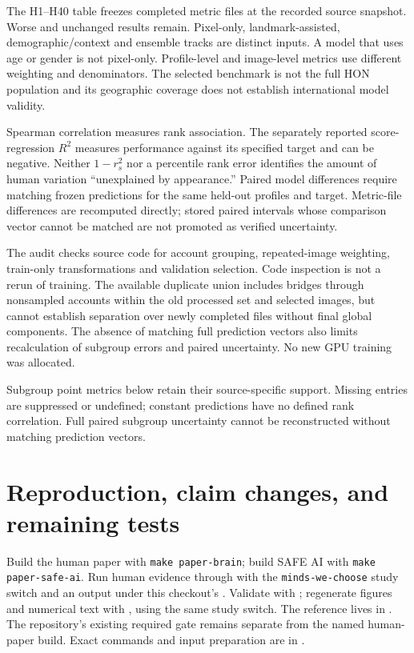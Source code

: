 The H1--H40 table freezes completed metric files at the recorded source snapshot. Worse and unchanged results remain. Pixel-only, landmark-assisted, demographic/context and ensemble tracks are distinct inputs. A model that uses age or gender is not pixel-only. Profile-level and image-level metrics use different weighting and denominators. The selected benchmark is not the full HON population and its geographic coverage does not establish international model validity.

Spearman correlation measures rank association. The separately reported score-regression $R^2$ measures performance against its specified target and can be negative. Neither $1-r_s^2$ nor a percentile rank error identifies the amount of human variation ``unexplained by appearance.'' Paired model differences require matching frozen predictions for the same held-out profiles and target. Metric-file differences are recomputed directly; stored paired intervals whose comparison vector cannot be matched are not promoted as verified uncertainty.

The audit checks source code for account grouping, repeated-image weighting, train-only transformations and validation selection. Code inspection is not a rerun of training. The available duplicate union includes bridges through nonsampled accounts within the old processed set and selected images, but cannot establish separation over newly completed files without final global components. The absence of matching full prediction vectors also limits recalculation of subgroup errors and paired uncertainty. No new GPU training was allocated.




\noindent Subgroup point metrics below retain their source-specific support. Missing entries are suppressed or undefined; constant predictions have no defined rank correlation. Full paired subgroup uncertainty cannot be reconstructed without matching prediction vectors.


\section{Reproduction, claim changes, and remaining tests}

Build the human paper with \texttt{make paper-brain}; build SAFE AI with \texttt{make paper-safe-ai}. Run human evidence through  with the \texttt{minds-we-choose} study switch and an output under this checkout's . Validate with ; regenerate figures and numerical text with , using the same study switch. The reference lives in . The repository's existing required gate remains separate from the named human-paper build. Exact commands and input preparation are in .

